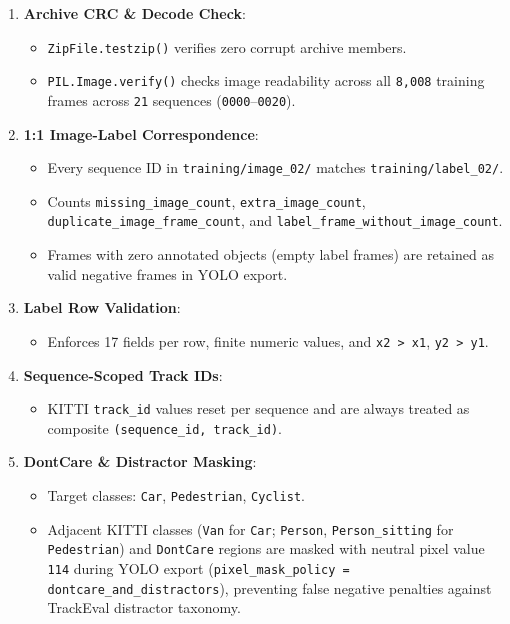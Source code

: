 \documentclass[10.5pt,a4paper]{article}
\begin{document}
\begin{enumerate}[leftmargin=1.8em,itemsep=2pt]
\item \textbf{Archive CRC \& Decode Check}:
\begin{itemize}[leftmargin=1.5em,itemsep=2pt]
\item \texttt{ZipFile.\allowbreak{}testzip()} verifies zero corrupt archive members.
\item \texttt{PIL.\allowbreak{}Image.\allowbreak{}verify()} checks image readability across all \texttt{8,\allowbreak{}008} training frames across \texttt{21} sequences (\texttt{0000}--\texttt{0020}).
\end{itemize}
\item \textbf{1:1 Image-Label Correspondence}:
\begin{itemize}[leftmargin=1.5em,itemsep=2pt]
\item Every sequence ID in \texttt{training/\allowbreak{}image\_\allowbreak{}02/\allowbreak{}} matches \texttt{training/\allowbreak{}label\_\allowbreak{}02/\allowbreak{}}.
\item Counts \texttt{missing\_\allowbreak{}image\_\allowbreak{}count}, \texttt{extra\_\allowbreak{}image\_\allowbreak{}count}, \texttt{duplicate\_\allowbreak{}image\_\allowbreak{}frame\_\allowbreak{}count}, and \texttt{label\_\allowbreak{}frame\_\allowbreak{}without\_\allowbreak{}image\_\allowbreak{}count}.
\item Frames with zero annotated objects (empty label frames) are retained as valid negative frames in YOLO export.
\end{itemize}
\item \textbf{Label Row Validation}:
\begin{itemize}[leftmargin=1.5em,itemsep=2pt]
\item Enforces 17 fields per row, finite numeric values, and \texttt{x2 > x1}, \texttt{y2 > y1}.
\end{itemize}
\item \textbf{Sequence-Scoped Track IDs}:
\begin{itemize}[leftmargin=1.5em,itemsep=2pt]
\item KITTI \texttt{track\_\allowbreak{}id} values reset per sequence and are always treated as composite \texttt{(sequence\_\allowbreak{}id,\allowbreak{} track\_\allowbreak{}id)}.
\end{itemize}
\item \textbf{DontCare \& Distractor Masking}:
\begin{itemize}[leftmargin=1.5em,itemsep=2pt]
\item Target classes: \texttt{Car}, \texttt{Pedestrian}, \texttt{Cyclist}.
\item Adjacent KITTI classes (\texttt{Van} for \texttt{Car}; \texttt{Person}, \texttt{Person\_\allowbreak{}sitting} for \texttt{Pedestrian}) and \texttt{DontCare} regions are masked with neutral pixel value \texttt{114} during YOLO export (\texttt{pixel\_\allowbreak{}mask\_\allowbreak{}policy = dontcare\_\allowbreak{}and\_\allowbreak{}distractors}), preventing false negative penalties against TrackEval distractor taxonomy.
\end{itemize}
\end{enumerate}
\end{document}
